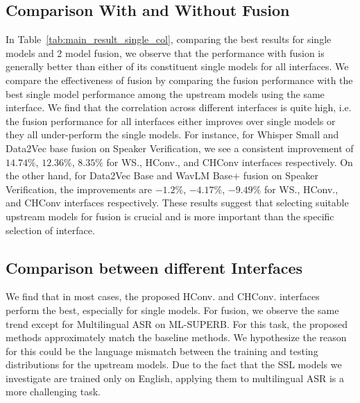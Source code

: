 \subsection{Comparison With and Without Fusion}
In Table~\ref{tab:main_result_single_col}, comparing the best results for single models and 2 model fusion, we observe that the performance with fusion is generally better than either of its constituent single models for all interfaces.
We compare the effectiveness of fusion by comparing the fusion performance with the best single model performance among the upstream models using the same interface. 
We find that the correlation across different interfaces is quite high, i.e. the fusion performance for all interfaces either improves over single models or they all under-perform the single models.
For instance, for Whisper Small and Data2Vec base fusion on Speaker Verification, we see a consistent improvement of $14.74\%$, $12.36\%$, $8.35\%$ for WS., HConv., and CHConv interfaces respectively. 
On the other hand, for Data2Vec Base and WavLM Base+ fusion on Speaker Verification, the improvements are $-1.2\%$, $-4.17\%$, $-9.49\%$ for WS., HConv., and CHConv interfaces respectively. 
These results suggest that selecting suitable upstream models for fusion is crucial and is more important than the specific selection of interface.




\subsection{Comparison between different Interfaces}
We find that in most cases, the proposed HConv. and CHConv. interfaces perform the best, especially for single models. For fusion, we observe the same trend except for Multilingual ASR on ML-SUPERB. For this task, the proposed methods approximately match the baseline methods.
We hypothesize the reason for this could be the language mismatch between the training and testing distributions for the upstream models.
Due to the fact that the SSL models we investigate are trained only on English, applying them to multilingual ASR is a more challenging task.%

